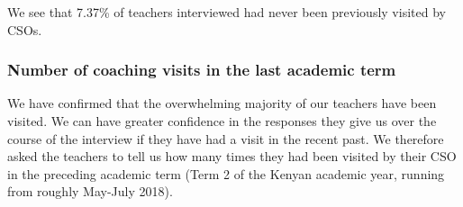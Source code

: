 \documentclass[11pt]{article}
\begin{document}
    We see that 7.37\% of teachers interviewed had never been previously
visited by CSOs.

    \hypertarget{number-of-coaching-visits-in-the-last-academic-term}{%
\subsubsection{Number of coaching visits in the last academic
term}\label{number-of-coaching-visits-in-the-last-academic-term}}

We have confirmed that the overwhelming majority of our teachers have
been visited. We can have greater confidence in the responses they give
us over the course of the interview if they have had a visit in the
recent past. We therefore asked the teachers to tell us how many times
they had been visited by their CSO in the preceding academic term (Term
2 of the Kenyan academic year, running from roughly May-July 2018).
\end{document}
